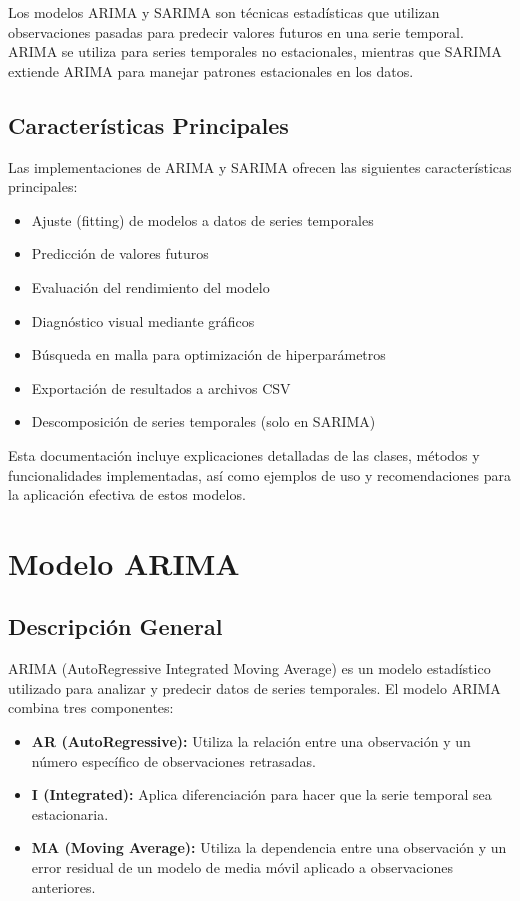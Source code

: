 \documentclass[12pt,letterpaper]{report}
\begin{document}
Los modelos ARIMA y SARIMA son técnicas estadísticas que utilizan observaciones pasadas para predecir valores futuros en una serie temporal. ARIMA se utiliza para series temporales no estacionales, mientras que SARIMA extiende ARIMA para manejar patrones estacionales en los datos.

\section{Características Principales}
Las implementaciones de ARIMA y SARIMA ofrecen las siguientes características principales:

\begin{itemize}
    \item Ajuste (fitting) de modelos a datos de series temporales
    \item Predicción de valores futuros
    \item Evaluación del rendimiento del modelo
    \item Diagnóstico visual mediante gráficos
    \item Búsqueda en malla para optimización de hiperparámetros
    \item Exportación de resultados a archivos CSV
    \item Descomposición de series temporales (solo en SARIMA)
\end{itemize}

Esta documentación incluye explicaciones detalladas de las clases, métodos y funcionalidades implementadas, así como ejemplos de uso y recomendaciones para la aplicación efectiva de estos modelos.

\chapter{Modelo ARIMA}

\section{Descripción General}
ARIMA (AutoRegressive Integrated Moving Average) es un modelo estadístico utilizado para analizar y predecir datos de series temporales. El modelo ARIMA combina tres componentes:

\begin{itemize}
    \item \textbf{AR (AutoRegressive):} Utiliza la relación entre una observación y un número específico de observaciones retrasadas.
    \item \textbf{I (Integrated):} Aplica diferenciación para hacer que la serie temporal sea estacionaria.
    \item \textbf{MA (Moving Average):} Utiliza la dependencia entre una observación y un error residual de un modelo de media móvil aplicado a observaciones anteriores.
\end{itemize}
\end{document}
